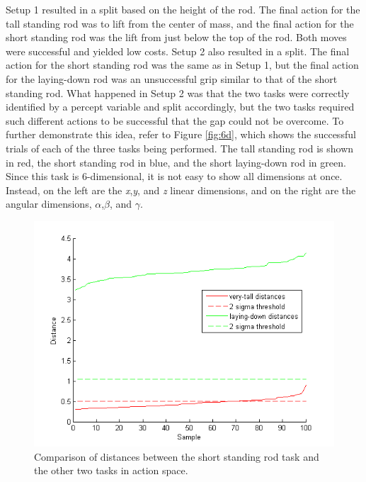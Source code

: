\documentclass[12pt]{article}
\begin{document}
Setup 1 resulted in a split based on the height of the rod. The final action for the tall standing rod was to lift from the center of mass, and the final action for the short standing rod was the lift from just below the top of the rod. Both moves were successful and yielded low costs. Setup 2 also resulted in a split. The final action for the short standing rod was the same as in Setup 1, but the final action for the laying-down rod was an unsuccessful grip similar to that of the short standing rod. What happened in Setup 2 was that the two tasks were correctly identified by a percept variable and split accordingly, but the two tasks required such different actions to be successful that the gap could not be overcome. To further demonstrate this idea, refer to Figure \ref{fig:6d}, which shows the successful trials of each of the three tasks being performed. The tall standing rod is shown in red, the short standing rod in blue, and the short laying-down rod in green. Since this task is 6-dimensional, it is not easy to show all dimensions at once. Instead, on the left are the \emph{x},\emph{y}, and \emph{z} linear dimensions, and on the right are the angular dimensions, \emph{$\alpha$},\emph{$\beta$}, and \emph{$\gamma$}. 

\begin{figure}[ht]
  \centering
  \includegraphics[width=0.8\columnwidth]{distance.png}
  \caption{\label{fig_label} Comparison of distances between the short standing rod task and the other two tasks in action space.}
  \label{fig:distance}
\end{figure}
\end{document}
